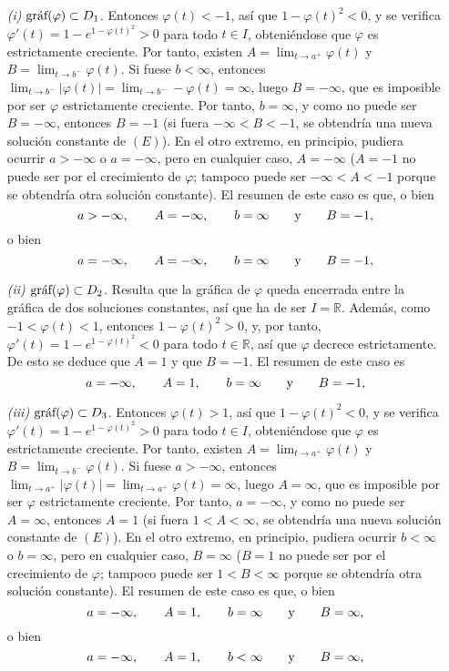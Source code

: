 \documentclass[11pt]{report}
\newcommand{\R}{\mathbb R}
\begin{document}
\begin{itemize}
    \item[\textit{(i)}] $\textup{gráf}(\varphi) \subset D_1$. Entonces $\varphi(t)<-1$, así que $1-\varphi(t)^2<0$, y se verifica $\varphi'(t)=1-e^{1-\varphi(t)^2}>0$ para todo $t \in I$, obteniéndose que $\varphi$ es estrictamente creciente. Por tanto, existen $A=\lim_{t \to a^+}\varphi(t)$ y $B=\lim_{t \to b^{-}}\varphi(t)$. Si fuese $b<\infty$, entonces $\lim_{t \to b^{-}} |\varphi(t)|=\lim_{t \to b^{-}} -\varphi(t)=\infty$, luego $B=-\infty$, que es imposible por ser $\varphi$ estrictamente creciente. Por tanto, $b=\infty$, y como no puede ser $B=-\infty$, entonces $B=-1$ (si fuera $-\infty<B<-1$, se obtendría una nueva solución constante de $(E)$). En el otro extremo, en principio, pudiera ocurrir $a>-\infty$ o $a=-\infty$, pero en cualquier caso, $A=-\infty$ ($A=-1$ no puede ser por el crecimiento de $\varphi$; tampoco puede ser $-\infty<A<-1$ porque se obtendría otra solución constante). El resumen de este caso es que, o bien
    \[a>-\infty, \qquad A=-\infty, \qquad b=\infty \qquad \textup{y} \qquad B=-1,\]
    o bien
    \[a=-\infty, \qquad A=-\infty, \qquad b=\infty \qquad \textup{y} \qquad B=-1,\]
    \item[\textit{(ii)}] $\textup{gráf}(\varphi) \subset D_2$. Resulta que la gráfica de $\varphi$ queda encerrada entre la gráfica de dos soluciones constantes, así que ha de ser $I=\R$. Además, como $-1<\varphi(t)<1$, entonces $1-\varphi(t)^2 >0$, y, por tanto, $\varphi'(t)=1-e^{1-\varphi(t)^2}<0$ para todo $t \in \R$, así que $\varphi$ decrece estrictamente. De esto se deduce que $A=1$ y que $B=-1$. El resumen de este caso es
    \[a=-\infty, \qquad A=1, \qquad b=\infty \qquad \textup{y} \qquad B=-1,\]
    \item[\textit{(iii)}] $\textup{gráf}(\varphi) \subset D_3$. Entonces $\varphi(t)>1$, así que $1-\varphi(t)^2<0$, y se verifica $\varphi'(t)=1-e^{1-\varphi(t)^2}>0$ para todo $t \in I$, obteniéndose que $\varphi$ es estrictamente creciente. Por tanto, existen $A=\lim_{t \to a^+}\varphi(t)$ y $B=\lim_{t \to b^{-}}\varphi(t)$. Si fuese $a>-\infty$, entonces $\lim_{t \to a^{+}} |\varphi(t)|=\lim_{t \to a^{+}} \varphi(t)=\infty$, luego $A=\infty$, que es imposible por ser $\varphi$ estrictamente creciente. Por tanto, $a=-\infty$, y como no puede ser $A=\infty$, entonces $A=1$ (si fuera $1<A<\infty$, se obtendría una nueva solución constante de $(E)$). En el otro extremo, en principio, pudiera ocurrir $b<\infty$ o $b=\infty$, pero en cualquier caso, $B=\infty$ ($B=1$ no puede ser por el crecimiento de $\varphi$; tampoco puede ser $1<B<\infty$ porque se obtendría otra solución constante). El resumen de este caso es que, o bien
    \[a=-\infty, \qquad A=1, \qquad b=\infty \qquad \textup{y} \qquad B=\infty,\]
    o bien
    \[a=-\infty, \qquad A=1, \qquad b<\infty \qquad \textup{y} \qquad B=\infty,\]
\end{itemize}
\end{document}
